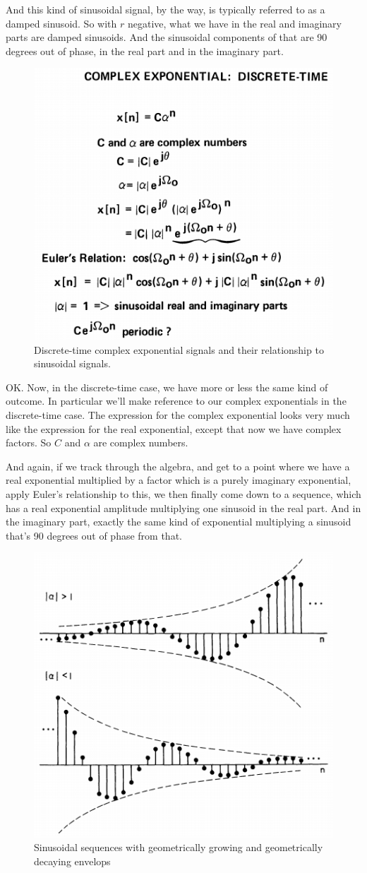 \documentclass[fleqn,10pt]{olplainarticle}
\theoremstyle{definition}
\theoremstyle{remark}
\begin{document}
And this kind of sinusoidal signal, by the way, is typically referred to as a damped sinusoid. So with $r$ negative, what we have in the real and imaginary parts are damped sinusoids. And the sinusoidal components of that are 90 degrees out of phase, in the real part and in the imaginary part.

\begin{figure}[ht]
	\centering
	\includegraphics[width=0.6\linewidth]{images/signals_19.png}
	\caption{Discrete-time complex exponential signals and their relationship to sinusoidal signals.}
	\label{fig:signals_19}
\end{figure}

OK. Now, in the discrete-time case, we have more or less the same kind of outcome. In particular we'll make reference to our complex exponentials in the discrete-time case. The expression for the complex exponential looks very much like the expression for the real exponential, except that now we have complex factors. So $C$ and $\alpha$ are complex numbers.

And again, if we track through the algebra, and get to a point where we have a real exponential multiplied by a factor which is a purely imaginary exponential, apply Euler's relationship to this, we then finally come down to a sequence, which has a real exponential amplitude multiplying one sinusoid in the real part. And in the imaginary part, exactly the same kind of exponential multiplying a sinusoid that's 90 degrees out of phase from that.

\begin{figure}[ht]
	\centering
	\includegraphics[width=0.4\linewidth]{images/signals_20.png}
	\caption{Sinusoidal sequences with geometrically growing and geometrically decaying envelops}
	\label{fig:signals_20}
\end{figure}
\end{document}
